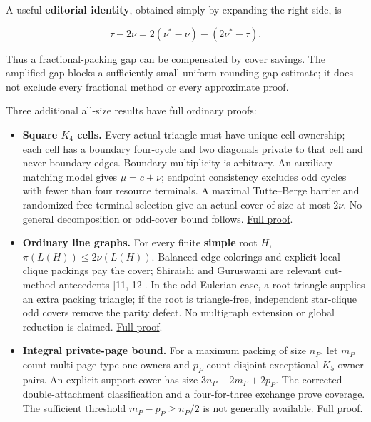 \documentclass[11pt,a4paper]{article}
\providecommand{\tightlist}{\setlength{\itemsep}{0pt}\setlength{\parskip}{0pt}}
\begin{document}
A useful \textbf{editorial identity}, obtained simply by expanding the right side, is

\[\tau-2\nu=2(\nu^*-\nu)-(2\nu^*-\tau).\]

Thus a fractional-packing gap can be compensated by cover savings. The amplified gap blocks a sufficiently small uniform rounding-gap estimate; it does not exclude every fractional method or every approximate proof.

Three additional all-size results have full ordinary proofs:

\begin{itemize}
\tightlist
\item
  \textbf{Square \(K_4\) cells.} Every actual triangle must have unique cell ownership; each cell has a boundary four-cycle and two diagonals private to that cell and never boundary edges. Boundary multiplicity is arbitrary. An auxiliary matching model gives \(\mu=c+\nu\); endpoint consistency excludes odd cycles with fewer than four resource terminals. A maximal Tutte--Berge barrier and randomized free-terminal selection give an actual cover of size at most \(2\nu\). No general decomposition or odd-cover bound follows. \href{https://github.com/pappa211/ai-math-experiments/blob/main/problems/TUZA-19/notes/global_routes_square_cells_matching.md}{Full proof}.
\item
  \textbf{Ordinary line graphs.} For every finite \textbf{simple} root \(H\), \(\pi(L(H))\le2\nu(L(H))\). Balanced edge colorings and explicit local clique packings pay the cover; Shiraishi and Guruswami are relevant cut-method antecedents {[}11, 12{]}. In the odd Eulerian case, a root triangle supplies an extra packing triangle; if the root is triangle-free, independent star-clique odd covers remove the parity defect. No multigraph extension or global reduction is claimed. \href{https://github.com/pappa211/ai-math-experiments/blob/main/problems/TUZA-19/notes/root_line_graph_parity.md}{Full proof}.
\item
  \textbf{Integral private-page bound.} For a maximum packing of size \(n_P\), let \(m_P\) count multi-page type-one owners and \(p_P\) count disjoint exceptional \(K_5\) owner pairs. An explicit support cover has size \(3n_P-2m_P+2p_P\). The corrected double-attachment classification and a four-for-three exchange prove coverage. The sufficient threshold \(m_P-p_P\ge n_P/2\) is not generally available. \href{https://github.com/pappa211/ai-math-experiments/blob/main/problems/TUZA-19/notes/root_multi_private_integral_cover.md}{Full proof}.
\end{itemize}
\end{document}
